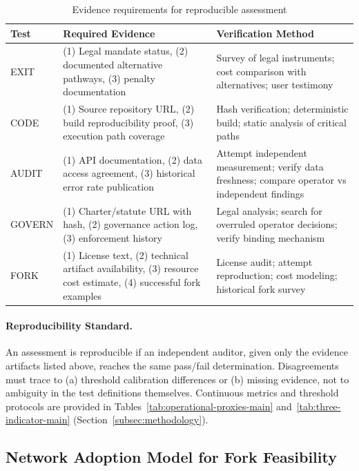\documentclass{article}
\begin{document}
\begin{table}[htbp]
\centering
\small
\caption{Evidence requirements for reproducible assessment}
\label{tab:evidence-requirements}
\begin{tabular}{@{}lp{5cm}p{5cm}@{}}
\toprule
\textbf{Test} & \textbf{Required Evidence} & \textbf{Verification Method} \\
\midrule
EXIT & (1) Legal mandate status, (2) documented alternative pathways, (3) penalty documentation & Survey of legal instruments; cost comparison with alternatives; user testimony \\
CODE & (1) Source repository URL, (2) build reproducibility proof, (3) execution path coverage & Hash verification; deterministic build; static analysis of critical paths \\
AUDIT & (1) API documentation, (2) data access agreement, (3) historical error rate publication & Attempt independent measurement; verify data freshness; compare operator vs independent findings \\
GOVERN & (1) Charter/statute URL with hash, (2) governance action log, (3) enforcement history & Legal analysis; search for overruled operator decisions; verify binding mechanism \\
FORK & (1) License text, (2) technical artifact availability, (3) resource cost estimate, (4) successful fork examples & License audit; attempt reproduction; cost modeling; historical fork survey \\
\bottomrule
\end{tabular}
\end{table}

\paragraph{Reproducibility Standard.} An assessment is reproducible if an independent auditor, given only the evidence artifacts listed above, reaches the same pass/fail determination. Disagreements must trace to (a) threshold calibration differences or (b) missing evidence, not to ambiguity in the test definitions themselves. Continuous metrics and threshold protocols are provided in Tables~\ref{tab:operational-proxies-main} and~\ref{tab:three-indicator-main} (Section~\ref{subsec:methodology}).

\subsection{Network Adoption Model for Fork Feasibility}
\end{document}
